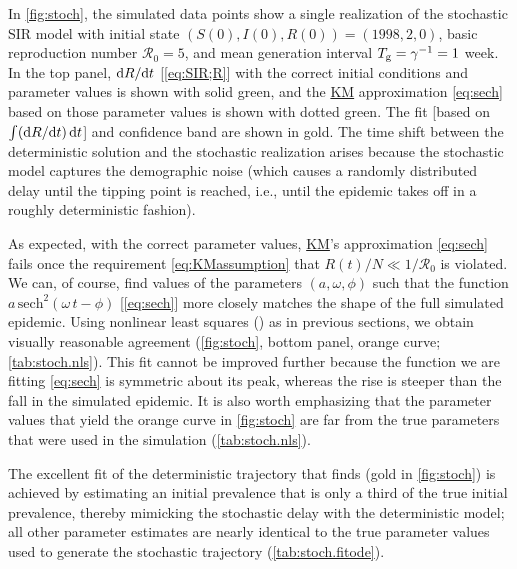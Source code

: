 \documentclass[]{interact}\usepackage[]{graphicx}\usepackage[]{xcolor}
\theoremstyle{plain}%
\theoremstyle{definition}
\theoremstyle{remark}
\newcommand{\dee}{{\rm d}}
\newcommand{\dbyd}[2]{{{\dee{#1}}/{\dee{#2}}}}
\newcommand{\dbydt}[1]{\dbyd{#1}{t}}
\newcommand{\dt}{\dee t}
\newcommand{\sech}{\,\textrm{sech}}
\newcommand{\R}{{\mathcal R}}
\newcommand{\Rn}{\R_0}
\newcommand{\Tg}{T_{\rm g}}
\newcommand{\KM}{\protect\hyperlink{cite.KermMcKe27}{KM}\xspace}
\newcommand{\code}[1]{\texttt{\detokenize{#1}}}
\newcommand{\nlscol}{orange\xspace}  %
\newcommand{\FOnbcol}{gold\xspace}
\newcommand{\determcol}{green\xspace}
\newcommand{\Sinit}{S(0)}
\newcommand{\Iinit}{I(0)}
\newcommand{\Rinit}{R(0)}
\begin{document}
In \cref{fig:stoch}, the simulated data points show a single
realization of the stochastic SIR model with initial state
$(\Sinit,\Iinit,\Rinit)=(1998, 2, 0)$, basic reproduction number
$\Rn=5$, and mean generation interval
$\Tg=\gamma^{-1}=1$ week.  In the top panel,
$\dbydt{R}$ [\cref{eq:SIR;R}] with the correct initial conditions and
parameter values is shown with solid \determcol, and the \KM
approximation \eqref{eq:sech} based on those parameter values is shown
with dotted \determcol.  The \code{fitode} fit [based on
$\int (\dbydt{R}) \,\dt$] and confidence band are shown in \FOnbcol.
The time shift between the deterministic solution and the stochastic
realization arises because the stochastic model captures the
demographic noise (which causes a randomly distributed delay until the
tipping point is reached, i.e., until the epidemic takes off in a
roughly deterministic fashion).

As expected, with the correct parameter values, \KM's approximation
\eqref{eq:sech} fails once the requirement \eqref{eq:KMassumption}
that $R(t)/N\ll1/\Rn$ is violated.  We can, of course, find values of
the parameters $(a,\omega,\phi)$ such that the function
$a\sech^2{(\omega\,t - \phi)}$ [\cref{eq:sech}] more closely matches
the shape of the full simulated epidemic.  Using nonlinear least
squares (\code{nls}) as in previous sections, we obtain visually
reasonable agreement (\cref{fig:stoch}, bottom panel, \nlscol curve;
\cref{tab:stoch.nls}). This \code{nls} fit cannot be improved further
because the function we are fitting \eqref{eq:sech} is symmetric about
its peak, whereas the rise is steeper than the fall in the simulated
epidemic.  It is also worth emphasizing that the parameter values that
yield the \nlscol curve in \cref{fig:stoch} are far from the true
parameters that were used in the simulation (\cref{tab:stoch.nls}).

The excellent fit of the deterministic trajectory that \code{fitode}
finds (\FOnbcol in \cref{fig:stoch}) is achieved by estimating an
initial prevalence that is only a third of the true initial
prevalence, thereby mimicking the stochastic delay with the
deterministic model; all other parameter estimates are nearly
identical to the true parameter values used to generate the stochastic
trajectory (\cref{tab:stoch.fitode}).











\end{document}
